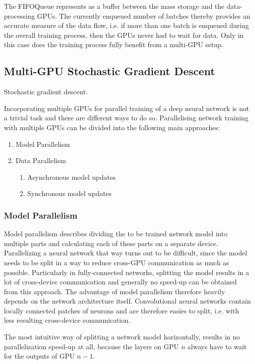 The FIFOQueue represents as a buffer between the mass storage and the data-processing GPUs.
The currently enqueued number of batches thereby provides an accurate measure of the data flow, i.e. if more than one batch is enqueued during the overall training process, then the GPUs never had to wait for data.
Only in this case does the training process fully benefit from a multi-GPU setup.


\subsection{Multi-GPU Stochastic Gradient Descent}
\label{sec:multi_gpu}

Stochastic gradient descent.

Incorporating multiple GPUs for parallel training of a deep neural network is not a trivial task and there are different ways to do so.
Parallelising network training with multiple GPUs can be divided into the following main approaches:
\begin{enumerate}
    \item Model Parallelism
    \item Data Parallelism
    \begin{enumerate}
        \item Asynchronous model updates
        \item Synchronous model updates
    \end{enumerate}
\end{enumerate}

\subsubsection{Model Parallelism}
Model parallelism describes dividing the to be trained network model into multiple parts and calculating each of these parts on a separate device.
Parallelizing a neural network that way turns out to be difficult, since the model needs to be split in a way to reduce cross-GPU communication as much as possible.
Particularly in fully-connected networks, splitting the model results in a lot of cross-device communication and generally no speed-up can be obtained from this approach.
The advantage of model parallelism therefore heavily depends on the network architecture itself.
Convolutional neural networks contain locally connected patches of neurons and are therefore easies to split, i.e. with less resulting cross-device communication.

The most intuitive way of splitting a network model horizontally, results in no parallelization speed-up at all, because the layers on GPU $n$ always have to wait for the outputs of GPU $n-1$.

